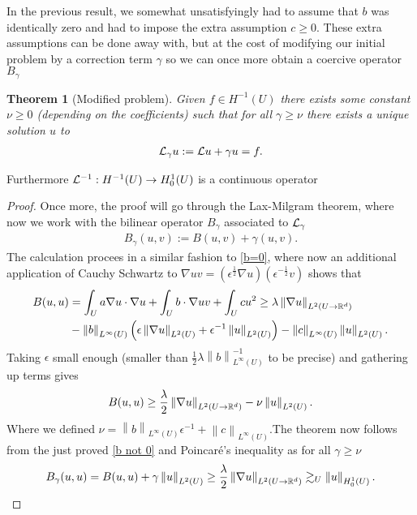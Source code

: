 \documentclass[12pt]{article}
\newtheorem{theorem}{Theorem}
\renewcommand{\norm}[1]{\left\lVert #1 \right\rVert}\renewcommand{\abs}[1]{\left| #1 \right|}
\newcommand{\qt}[1]{\left(#1\right)}
\begin{document}
In the previous result, we somewhat unsatisfyingly had to assume that $ b$ was identically zero and had to impose the extra assumption  $c \geq 0$. These extra assumptions can be done away with, but at the cost of modifying our initial problem by a correction term $\gamma $ so we can once more obtain a coercive operator $B_\gamma $
\begin{theorem}[Modified problem]\label{mod}
	Given $f \in  H^{-1}(U)$ there exists some constant $\nu \geq 0$ (depending on the coefficients) such that for all $\gamma \geq \nu$  there exists a unique solution $u$ to
	\begin{align*}
		\mathcal{L}_\gamma u:= \mathcal{L} u+ \gamma u=f.
	\end{align*}
\end{theorem}
Furthermore $\mathcal{L}^{-1}: H^{-1}(U) \to H^1_0(U)$ is a continuous operator
\begin{proof}
	Once more, the proof will go through the Lax-Milgram theorem, where now we work with the bilinear operator $B_\gamma  $ associated to $\mathcal{L}_\gamma  $
	\begin{align*}
		B_\gamma  (u,v):= B(u,v) + \gamma  (u,v).
	\end{align*}
	The calculation procees in a similar fashion to  \eqref{b=0}, where now an additional application of Cauchy Schwartz to $\nabla u v = (\epsilon^{\frac{1}{2}} \nabla u)(\epsilon^{-\frac{1}{2}}v)$  shows that
	\begin{align*}
		B(u,u) & = \int_{U}a \nabla u \cdot \nabla u + \int_{U} b\cdot  \nabla u v +  \int_{U} cu^2 \geq \lambda \norm{\nabla u}_{L^2(U \to \R^d)}           \\
		       & - \norm{b}_{L^\infty(U)} \qt{\epsilon \norm{\nabla u}_{L^2(U)}+ \epsilon ^{-1}\norm{u}_{L^2(U)}}- \norm{c}_{L^\infty(U)}\norm{u}_{L^2(U)} .
	\end{align*}
	Taking $\epsilon $ small enough (smaller than $\frac{1}{2} \lambda \norm{b}_{L^\infty(U)}^{-1}$ to be precise) and gathering up terms gives
	\begin{align}\label{b not 0}
		B(u,u) \geq \frac{\lambda}{2} \norm{\nabla u}_{L^2(U \to \R^d)} -\nu \norm{u}_{L^2(U)}.
	\end{align}
	Where we defined $\nu = \norm{b}_{L^\infty(U)} \epsilon ^{-1}+\norm{c}_{L^\infty(U)}$.The theorem now follows from the just proved \eqref{b not 0} and Poincaré's inequality as for all $\gamma \geq \nu$
	\begin{align*}
		B_\gamma (u,u)=B(u,u)+ \gamma \norm{u}_{L^2(U)} \geq\frac{\lambda}{2} \norm{\nabla u}_{L^2(U \to \R^d)}\gtrsim _U \norm{u}_{H_0^1(U)} .
	\end{align*}
\end{proof}
\end{document}
